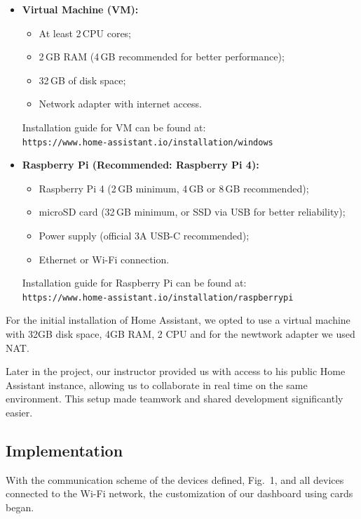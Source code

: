 \documentclass[graybox]{svmult}
\begin{document}
\begin{itemize}
    \item \textbf{Virtual Machine (VM):}
    \begin{itemize}
        \item At least 2\,CPU cores;
        \item 2\,GB RAM (4\,GB recommended for better performance);
        \item 32\,GB of disk space;
        \item Network adapter with internet access.
    \end{itemize}
    Installation guide for VM can be found at:\\
    \texttt{https://www.home-assistant.io/installation/windows}
    \\
    \item \textbf{Raspberry Pi (Recommended: Raspberry Pi 4):}
    \begin{itemize}
        \item Raspberry Pi 4 (2\,GB minimum, 4\,GB or 8\,GB recommended);
        \item microSD card (32\,GB minimum, or SSD via USB for better reliability);
        \item Power supply (official 3A USB-C recommended);
        \item Ethernet or Wi-Fi connection.
    \end{itemize}
    Installation guide for Raspberry Pi can be found at:\\
    \texttt{https://www.home-assistant.io/installation/raspberrypi}
\end{itemize}

For the initial installation of Home Assistant, we opted to use a virtual machine with 32GB disk space, 4GB RAM, 2 CPU and for the newtwork adapter we used NAT.

Later in the project, our instructor provided us with access to his public Home Assistant instance, allowing us to collaborate in real time on the same environment. This setup made teamwork and shared development significantly easier.

\subsection{Implementation}
With the communication scheme of the devices defined, Fig.~1, and all devices connected to the Wi-Fi network, the customization of our dashboard using cards began.\\
\end{document}
